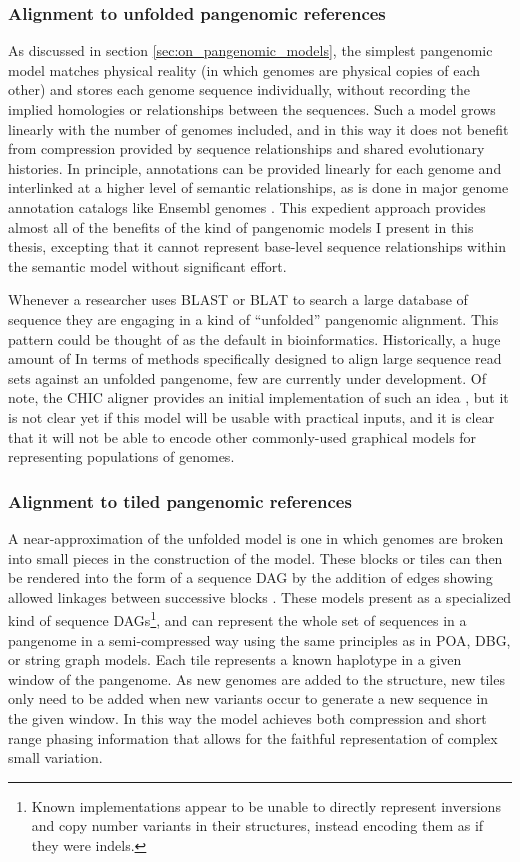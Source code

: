 \subsubsection{Alignment to unfolded pangenomic references}

As discussed in section \ref{sec:on_pangenomic_models}, the simplest pangenomic model matches physical reality (in which genomes are physical copies of each other) and stores each genome sequence individually, without recording the implied homologies or relationships between the sequences.
Such a model grows linearly with the number of genomes included, and in this way it does not benefit from compression provided by sequence relationships and shared evolutionary histories.
In principle, annotations can be provided linearly for each genome and interlinked at a higher level of semantic relationships, as is done in major genome annotation catalogs like Ensembl genomes \cite{kersey2015ensembl}.
This expedient approach provides almost all of the benefits of the kind of pangenomic models I present in this thesis, excepting that it cannot represent base-level sequence relationships within the semantic model without significant effort.

Whenever a researcher uses BLAST or BLAT to search a large database of sequence they are engaging in a kind of ``unfolded'' pangenomic alignment.
This pattern could be thought of as the default in bioinformatics.
Historically, a huge amount of
In terms of methods specifically designed to align large sequence read sets against an unfolded pangenome, few are currently under development.
Of note, the CHIC aligner provides an initial implementation of such an idea \cite{valenzuela2017chic}, but it is not clear yet if this model will be usable with practical inputs, and it is clear that it will not be able to encode other commonly-used graphical models for representing populations of genomes.

\subsubsection{Alignment to tiled pangenomic references}

A near-approximation of the unfolded model is one in which genomes are broken into small pieces in the construction of the model.
These blocks or tiles can then be rendered into the form of a sequence DAG by the addition of edges showing allowed linkages between successive blocks \cite{guthrie2015tiling}.
These models present as a specialized kind of sequence DAGs\footnote{Known implementations appear to be unable to directly represent inversions and copy number variants in their structures, instead encoding them as if they were indels.}, and can represent the whole set of sequences in a pangenome in a semi-compressed way using the same principles as in POA, DBG, or string graph models.
Each tile represents a known haplotype in a given window of the pangenome.
As new genomes are added to the structure, new tiles only need to be added when new variants occur to generate a new sequence in the given window.
In this way the model achieves both compression and short range phasing information that allows for the faithful representation of complex small variation.

